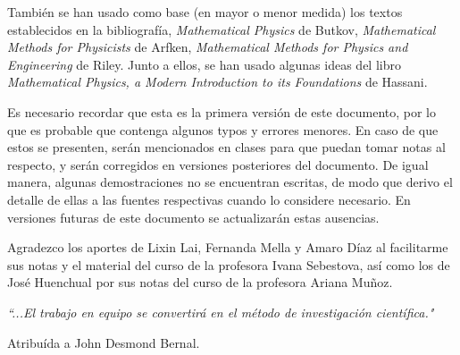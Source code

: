 \documentclass[letterpaper,12pt, twoside]{book}
\theoremstyle{definition}
\begin{document}
También se han usado como base (en mayor o menor medida) los textos establecidos en la bibliografía, \emph{Mathematical Physics} de Butkov, \emph{Mathematical Methods for Physicists} de Arfken, \emph{Mathematical Methods for Physics and Engineering} de Riley. Junto a ellos, se han usado algunas ideas del libro \emph{Mathematical Physics, a Modern Introduction to its Foundations} de Hassani.

Es necesario recordar que esta es la primera versión de este documento, por lo que es probable que contenga algunos typos y errores menores. En caso de que estos se presenten, serán mencionados en clases para que puedan tomar notas al respecto, y serán corregidos en versiones posteriores del documento. De igual manera, algunas demostraciones no se encuentran escritas, de modo que derivo el detalle de ellas a las fuentes respectivas cuando lo considere necesario. En versiones futuras de este documento se actualizarán estas ausencias.


Agradezco los aportes de Lixin Lai, Fernanda Mella y Amaro Díaz al facilitarme sus notas y el material del curso de la profesora Ivana Sebestova, así como los de José Huenchual por sus notas del curso de la profesora Ariana Muñoz.

\vfill

\emph{\textquotedblleft ...El trabajo en equipo se convertirá en el método de investigación científica."}

\begin{flushright}
Atribuída a John Desmond Bernal.
\end{flushright}



\tableofcontents

\mainmatter

\pagestyle{fancy}











\appendix

% 
% 

\backmatter

\nocite{*} %
\setcounter{chapter}{0}

\printbibliography[heading=bibintoc, title=Referencias]
\end{document}
